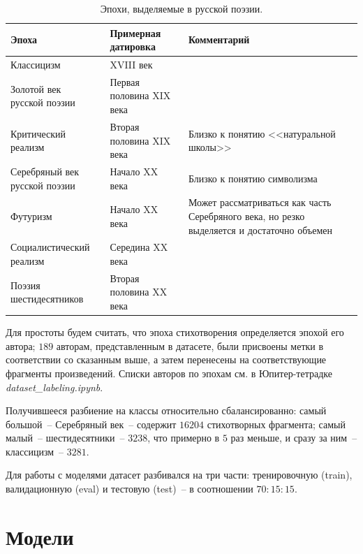 \documentclass[a4paper,12pt]{article}
\begin{document}
\begin{table}[t]
\centering
\begin{tabular}[t]{|m{3.4cm}|m{3.6cm}|m{8cm}|}
    \hline
    Эпоха & \makecell[l]{Примерная \\ датировка} & Комментарий \\
    \hline
    \hline
    Классицизм & XVIII век & \\
    \hline
    \makecell[l]{Золотой век \\ русской поэзии} & Первая половина XIX века & \\
    \hline
    \makecell[l]{Критический \\ реализм} & Вторая половина XIX века & Близко к понятию <<натуральной школы>> \\
    \hline
    \makecell[l]{Серебряный век \\ русской поэзии} & Начало XX века & Близко к понятию символизма \\
    \hline
    Футуризм & Начало XX века & Может рассматриваться как часть Серебряного века, но резко выделяется и достаточно объемен \\
    \hline
    Социалистический реализм & Середина XX века & \\
    \hline
    \makecell[l]{Поэзия \\ шестидесятников} & Вторая половина XX века & \\
    \hline
\end{tabular}
\caption{Эпохи, выделяемые в русской поэзии.}
\label{tab:epoches}
\end{table}

Для простоты будем считать, что эпоха стихотворения определяется эпохой его автора; $189$ авторам, представленным в датасете, были присвоены метки в соответствии со сказанным выше, а затем перенесены на соответствующие фрагменты произведений. Списки авторов по эпохам см. в Юпитер-тетрадке \textit{dataset\_labeling.ipynb}.

Получившееся разбиение на классы относительно сбалансированно: самый большой~-- Серебряный век~-- содержит $16204$ стихотворных фрагмента; самый малый~-- шестидесятники~-- $3238$, что примерно в $5$ раз меньше, и сразу за ним~-- классицизм~-- $3281$. 

Для работы с моделями датасет разбивался на три части: тренировочную (train), валидационную (eval) и тестовую (test)~-- в соотношении $70:15:15$.


\section{Модели}
\end{document}
